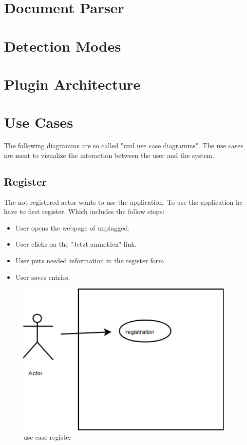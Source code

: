 \section{Document Parser}

\section{Detection Modes}

\section{Plugin Architecture}

\section{Use Cases}
The following diagramms are so called "uml use case diagramms". The use cases are ment to visualize the interaction between the user and the system.
\subsection{Register}
The not registered actor wants to use the application. To use the application he have to first register. Which includes the follow steps:
\minisec{}
\begin{itemize}
\item User opens the webpage of unplagged.
\item User clicks on the "Jetzt anmelden" link.
\item User puts needed information in the register form.
\item User saves entries.
\end{itemize}
\begin{figure}[!ht]
  \centering
    \includegraphics[width=0.97\textwidth]{images/use_cases/registration.png}
  \caption{use case register}
  \label{fig:use case register}
\end{figure}

